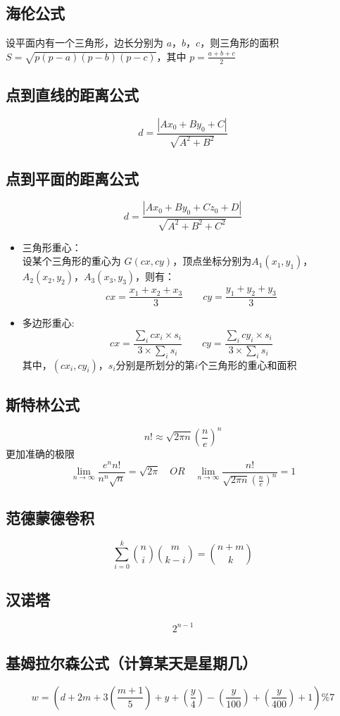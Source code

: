 \subsection{海伦公式}
设平面内有一个三角形，边长分别为 $a$，$b$，$c$，则三角形的面积 $S = \sqrt{p(p-a)(p-b)(p-c)}$，其中 $p=\frac{a+b+c}{2}$
\subsection{点到直线的距离公式}
$$
d = \frac{\left| Ax_0 + By_0 + C \right|}{\sqrt{A^2 + B^2}}
$$
\subsection{点到平面的距离公式}
$$
d = \frac{\left| Ax_0 + By_0 + Cz_0 + D \right|}{\sqrt{A^2 + B^2 + C^2}}
$$
\begin{itemize}
	\item 三角形重心：\\ 设某个三角形的重心为 $G(cx, cy)$，顶点坐标分别为$A_1(x_1, y_1)$，$A_2(x_2, y_2)$，$A_3(x_3, y_3)$，则有：
		$$
		cx = \frac{x_1 + x_2 + x_3}{3} \qquad cy = \frac{y_1 + y_2 + y_3}{3}
		$$
	\item 多边形重心: \\
		$$
		cx = \frac{\sum_i cx_i \times s_i}{3 \times \sum_i s_i}
		\qquad
		cy = \frac{\sum_i cy_i \times s_i}{3 \times \sum_i s_i}
		$$
		其中，$(cx_i, cy_i)$，$s_i$分别是所划分的第$i$个三角形的重心和面积
\end{itemize}
\subsection{斯特林公式}
$$
n! \approx \sqrt{2 \pi n}\left(\frac{n}{e}\right)^n
$$
更加准确的极限
$$
\lim_{n \rightarrow \infty} \frac{e^n n!}{n^n \sqrt{n}} = \sqrt{2 \pi}
\quad OR \quad
\lim_{n \rightarrow \infty} \frac{n!}{\sqrt{2 \pi n} \left(\frac{n}{e}\right)^n} = 1
$$
\subsection{范德蒙德卷积}
$$
\sum_{i = 0}^k \binom{n}{i} \binom{m}{k - i} = \binom{n + m}{k}
$$
\subsection{汉诺塔}
$$
2^{n - 1}
$$
\subsection{基姆拉尔森公式（计算某天是星期几）}
$$
w = \left( d + 2m + 3 \left( \frac{m + 1}{5} \right) + y + \left( \frac{y}{4} \right) - \left( \frac{y}{100} \right) + \left( \frac{y}{400} \right) + 1 \right) \% 7
$$
